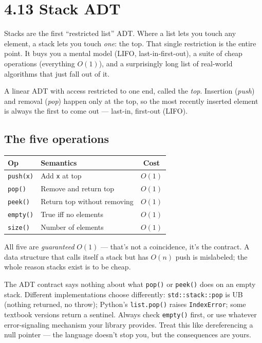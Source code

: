 \documentclass[11pt]{article}
\begin{document}
\section{4.13 Stack ADT}

Stacks are the first ``restricted list'' ADT. Where a list lets
you touch any element, a stack lets you touch \emph{one}: the
top. That single restriction is the entire point. It buys you a
mental model (LIFO, last-in-first-out), a suite of cheap
operations (everything $O(1)$), and a surprisingly long list of
real-world algorithms that just fall out of it.

\begin{defnbox}[Stack]
A linear ADT with access restricted to one end, called the
\emph{top}. Insertion (\emph{push}) and removal (\emph{pop})
happen only at the top, so the most recently inserted element is
always the first to come out --- last-in, first-out (LIFO).
\end{defnbox}

\subsection*{The five operations}

\begin{center}
\begin{tabular}{|l|l|c|}
\hline
\textbf{Op} & \textbf{Semantics} & \textbf{Cost} \\
\hline
\texttt{push(x)}  & Add \texttt{x} at top           & $O(1)$ \\
\texttt{pop()}    & Remove and return top           & $O(1)$ \\
\texttt{peek()}   & Return top without removing     & $O(1)$ \\
\texttt{empty()}  & True iff no elements            & $O(1)$ \\
\texttt{size()}   & Number of elements              & $O(1)$ \\
\hline
\end{tabular}
\end{center}

All five are \emph{guaranteed} $O(1)$ --- that's not a coincidence,
it's the contract. A data structure that calls itself a stack but
has $O(n)$ push is mislabeled; the whole reason stacks exist is to
be cheap.

\begin{warnbox}
The ADT contract says nothing about what \texttt{pop()} or
\texttt{peek()} does on an empty stack. Different implementations
choose differently: \texttt{std::stack::pop} is UB (nothing
returned, no throw); Python's \texttt{list.pop()} raises
\texttt{IndexError}; some textbook versions return a sentinel.
Always check \texttt{empty()} first, or use whatever
error-signaling mechanism your library provides. Treat this like
dereferencing a null pointer --- the language doesn't stop you,
but the consequences are yours.
\end{warnbox}
\end{document}
